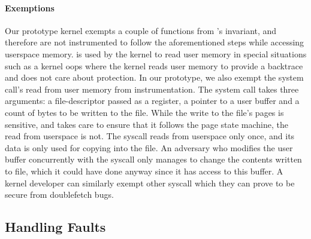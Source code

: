 \documentclass[letterpaper,twocolumn,10pt, anonymous]{article}
\begin{document}
\paragraph{Exemptions}
Our prototype \tiktok kernel exempts a couple of functions 
from \tiktok's invariant, and therefore are not instrumented 
to follow the aforementioned steps while accessing userspace
memory. 
 is used by the kernel to 
read user memory in special situations such as a kernel 
oops\footnotemark 
where the kernel reads user memory to provide a backtrace and 
does not care about \tocttou protection.
In our prototype, we also exempt the  system 
call's read from user memory from instrumentation.
The  system call takes three arguments: a 
file-descriptor passed as a register, a pointer to a user 
buffer and a count of bytes to be written to the file.
While the write to the file's pages is sensitive, and 
\tiktok takes care to ensure that it follows the page state 
machine, the read from userspace is not. 
The syscall reads from userspace only once, and its data 
is only used for copying into the file.
An adversary who modifies the user buffer concurrently with 
the syscall only manages to change the contents written to 
file, which it could have done anyway since it has access to 
this buffer.
A kernel developer can similarly exempt other syscall which 
they can prove to be secure from doublefetch bugs.


\subsection{Handling Faults}
\end{document}
